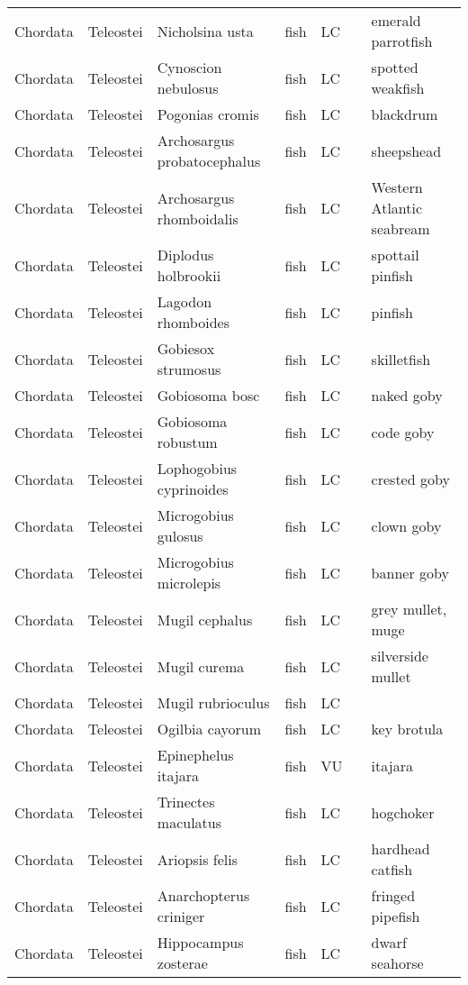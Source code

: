 \begin{longtable}{lllllll}
  Chordata & Teleostei & Nicholsina usta & fish & LC &  & emerald parrotfish \\ 
  Chordata & Teleostei & Cynoscion nebulosus & fish & LC &  & spotted weakfish \\ 
  Chordata & Teleostei & Pogonias cromis & fish & LC &  & blackdrum \\ 
  Chordata & Teleostei & Archosargus probatocephalus & fish & LC &  & sheepshead \\ 
  Chordata & Teleostei & Archosargus rhomboidalis & fish & LC &  & Western Atlantic seabream \\ 
  Chordata & Teleostei & Diplodus holbrookii & fish & LC &  & spottail pinfish \\ 
  Chordata & Teleostei & Lagodon rhomboides & fish & LC &  & pinfish \\ 
  Chordata & Teleostei & Gobiesox strumosus & fish & LC &  & skilletfish \\ 
  Chordata & Teleostei & Gobiosoma bosc & fish & LC &  & naked goby \\ 
  Chordata & Teleostei & Gobiosoma robustum & fish & LC &  & code goby \\ 
  Chordata & Teleostei & Lophogobius cyprinoides & fish & LC &  & crested goby \\ 
  Chordata & Teleostei & Microgobius gulosus & fish & LC &  & clown goby \\ 
  Chordata & Teleostei & Microgobius microlepis & fish & LC &  & banner goby \\ 
  Chordata & Teleostei & Mugil cephalus & fish & LC &  & grey mullet, muge \\ 
  Chordata & Teleostei & Mugil curema & fish & LC &  & silverside mullet \\ 
  Chordata & Teleostei & Mugil rubrioculus & fish & LC &  &  \\ 
  Chordata & Teleostei & Ogilbia cayorum & fish & LC &  & key brotula \\ 
  Chordata & Teleostei & Epinephelus itajara & fish & VU &  & itajara \\ 
  Chordata & Teleostei & Trinectes maculatus & fish & LC &  & hogchoker \\ 
  Chordata & Teleostei & Ariopsis felis & fish & LC &  & hardhead catfish \\ 
  Chordata & Teleostei & Anarchopterus criniger & fish & LC &  & fringed pipefish \\ 
  Chordata & Teleostei & Hippocampus zosterae & fish & LC &  & dwarf seahorse \\ 

\end{longtable}
